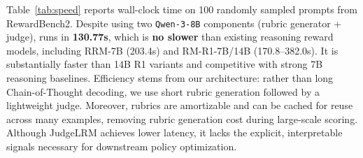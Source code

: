 Table~\ref{tab:speed} reports wall-clock time on 100 randomly sampled prompts from RewardBench2. 
Despite using two \texttt{Qwen-3-8B} components (rubric generator + judge), {\name} runs in \textbf{130.77s}, which is \textbf{no slower} than existing reasoning reward models, including RRM-7B (203.4s) and RM-R1-7B/14B (170.8–382.0s). It is substantially faster than 14B R1 variants and competitive with strong 7B reasoning baselines. 
Efficiency stems from our architecture: rather than long Chain-of-Thought decoding, we use short rubric generation followed by a lightweight judge. 
Moreover, rubrics are amortizable and can be cached for reuse across many examples, removing rubric generation cost during large-scale scoring. 
Although JudgeLRM achieves lower latency, it lacks the explicit, interpretable signals necessary for downstream policy optimization. %




